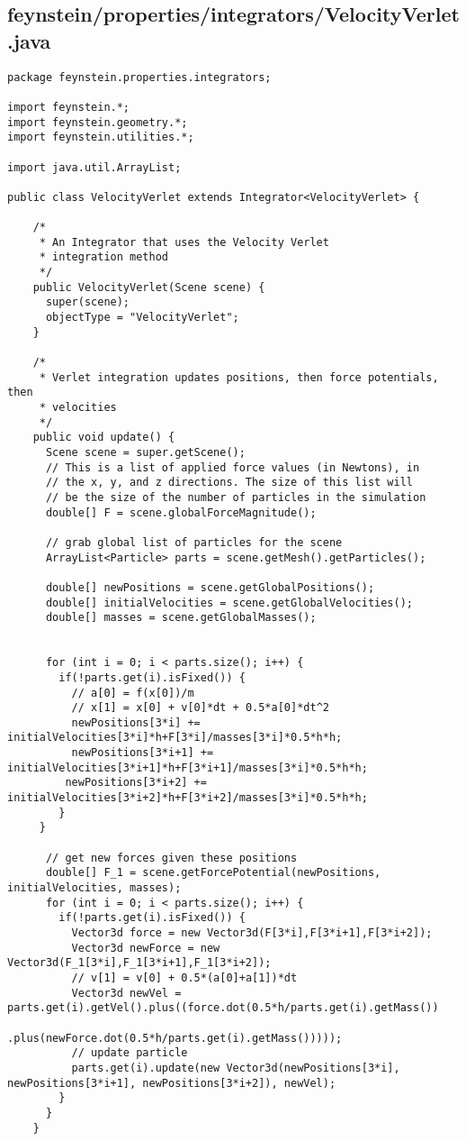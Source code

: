 \subsection*{feynstein/properties/integrators/VelocityVerlet.java}
\begin{lstlisting}
package feynstein.properties.integrators;

import feynstein.*;
import feynstein.geometry.*;
import feynstein.utilities.*;

import java.util.ArrayList;

public class VelocityVerlet extends Integrator<VelocityVerlet> {
    
	/*
	 * An Integrator that uses the Velocity Verlet
	 * integration method
	 */
	public VelocityVerlet(Scene scene) {
	  super(scene);
	  objectType = "VelocityVerlet";
    }
	
	/*
	 * Verlet integration updates positions, then force potentials, then
	 * velocities
	 */
    public void update() {
	  Scene scene = super.getScene();
	  // This is a list of applied force values (in Newtons), in 
	  // the x, y, and z directions. The size of this list will
	  // be the size of the number of particles in the simulation
	  double[] F = scene.globalForceMagnitude();
	  
	  // grab global list of particles for the scene
	  ArrayList<Particle> parts = scene.getMesh().getParticles();
	
	  double[] newPositions = scene.getGlobalPositions();
	  double[] initialVelocities = scene.getGlobalVelocities();
	  double[] masses = scene.getGlobalMasses();
		
		
	  for (int i = 0; i < parts.size(); i++) {
		if(!parts.get(i).isFixed()) {
		  // a[0] = f(x[0])/m
		  // x[1] = x[0] + v[0]*dt + 0.5*a[0]*dt^2
		  newPositions[3*i] += initialVelocities[3*i]*h+F[3*i]/masses[3*i]*0.5*h*h;
		  newPositions[3*i+1] += initialVelocities[3*i+1]*h+F[3*i+1]/masses[3*i]*0.5*h*h;
		 newPositions[3*i+2] += initialVelocities[3*i+2]*h+F[3*i+2]/masses[3*i]*0.5*h*h;
	    }
	 }
		
	  // get new forces given these positions
	  double[] F_1 = scene.getForcePotential(newPositions, initialVelocities, masses);
	  for (int i = 0; i < parts.size(); i++) {
	    if(!parts.get(i).isFixed()) {
		  Vector3d force = new Vector3d(F[3*i],F[3*i+1],F[3*i+2]);
		  Vector3d newForce = new Vector3d(F_1[3*i],F_1[3*i+1],F_1[3*i+2]);
		  // v[1] = v[0] + 0.5*(a[0]+a[1])*dt
		  Vector3d newVel = parts.get(i).getVel().plus((force.dot(0.5*h/parts.get(i).getMass())
							      .plus(newForce.dot(0.5*h/parts.get(i).getMass()))));
		  // update particle
		  parts.get(i).update(new Vector3d(newPositions[3*i], newPositions[3*i+1], newPositions[3*i+2]), newVel);
	    }
	  }
    }


\end{lstlisting}
